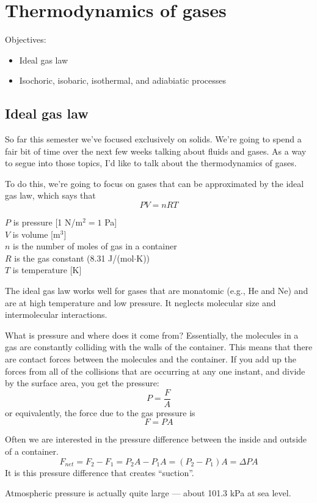 \section{Thermodynamics of gases}
Objectives:
\begin{itemize}
\item Ideal gas law
\item Isochoric, isobaric, isothermal, and adiabiatic processes
\end{itemize}

\hrulefill

\subsection{Ideal gas law}
So far this semester we've focused exclusively on solids. We're going to spend a fair bit of time over the next few weeks talking about fluids and gases. As a way to segue into those topics, I'd like to talk about the thermodynamics of gases.

To do this, we're going to focus on gases that can be approximated by the ideal gas law, which says that
$$PV=nRT$$

$P$ is pressure [1 N/m$^2=1$ Pa]\\
$V$ is volume [m$^3$]\\
$n$ is the number of moles of gas in a container\\
$R$ is the gas constant (8.31 J/(mol$\cdot$K))\\
$T$ is temperature [K]

The ideal gas law works well for gases that are monatomic (e.g., He and Ne) and are at high temperature and low pressure. It neglects molecular size and intermolecular interactions.

What is pressure and where does it come from? Essentially, the molecules in a gas are constantly colliding with the walls of the container. This means that there are contact forces between the molecules and the container. If you add up the forces from all of the collisions that are occurring at any one instant, and divide by the surface area, you get the pressure:
$$P=\frac{F}{A}$$
or equivalently, the force due to the gas pressure is
$$F=PA$$

Often we are interested in the pressure difference between the inside and outside of a container. 
$$F_{net}=F_2-F_1=P_2A-P_1A=(P_2-P_1)A=\Delta{P}A$$
It is this pressure difference that creates ``suction''.

Atmospheric pressure is actually quite large --- about 101.3 kPa at sea level. 


